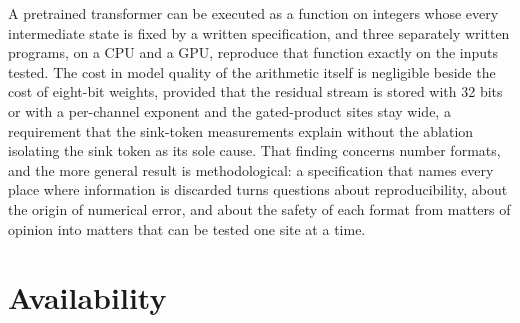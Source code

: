 \documentclass[11pt]{article}
\begin{document}
A pretrained transformer can be executed as a function on integers whose every intermediate state is fixed by a written specification, and three separately written programs, on a CPU and a GPU, reproduce that function exactly on the inputs tested. The cost in model quality of the arithmetic itself is negligible beside the cost of eight-bit weights, provided that the residual stream is stored with 32 bits or with a per-channel exponent and the gated-product sites stay wide, a requirement that the sink-token measurements explain without the ablation isolating the sink token as its sole cause. That finding concerns number formats, and the more general result is methodological: a specification that names every place where information is discarded turns questions about reproducibility, about the origin of numerical error, and about the safety of each format from matters of opinion into matters that can be tested one site at a time.

\section*{Availability}
\end{document}
